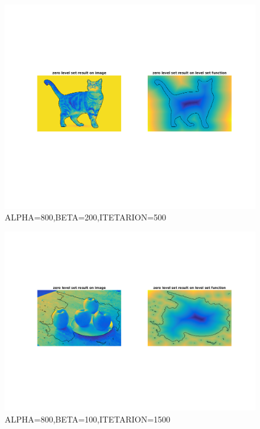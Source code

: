 \documentclass[a4paper, UTF8]{ctexrep}
\begin{document}
			\begin{figure}[htbp!]
				\centering
				\includegraphics[width=\textwidth]{hw3_fig6.png}
				\caption{ALPHA=800,BETA=200,ITETARION=500}
				\label{fig:figure1}
			\end{figure}
			\begin{figure}[htbp!]
				\centering
				\includegraphics[width=\textwidth]{hw3_fig7.png}
				\caption{ALPHA=800,BETA=100,ITETARION=1500}
				\label{fig:figure1}
			\end{figure}
\end{document}
